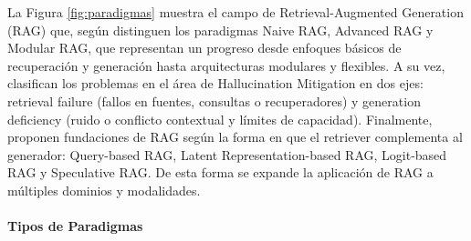 La Figura \ref{fig:paradigmas} muestra el campo de Retrieval-Augmented Generation (RAG) que, según \textcite{gao2023rag} distinguen los paradigmas Naive RAG, Advanced RAG y Modular RAG, que representan un progreso
desde enfoques básicos de recuperación y generación hasta arquitecturas modulares y flexibles. A su vez, \textcite{zhang2025hallucination} clasifican los problemas en el área de 
Hallucination Mitigation en dos ejes: retrieval failure (fallos en fuentes, consultas o recuperadores) y generation deficiency 
(ruido o conflicto contextual y límites de capacidad). Finalmente, 
\textcite{zhao2024rag} proponen fundaciones de RAG según la forma en que el retriever complementa al generador: Query-based RAG, Latent Representation-based RAG,
Logit-based RAG y Speculative RAG. De esta forma se expande la aplicación de RAG a múltiples dominios y modalidades.



\paragraph{Tipos de Paradigmas}

